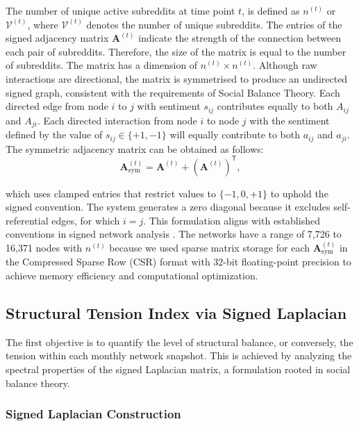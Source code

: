 \documentclass[a4paper,fleqn]{cas-dc}
\begin{document}
The number of unique active subreddits at time point \( t \), is defined as \( n^{(t)} \) or \( \mathcal{V}^{(t)}\), where \( \mathcal{V}^{(t)} \) denotes the number of unique subreddits. The entries of the signed adjacency matrix \( \mathbf{A}^{(t)} \) indicate the strength of the connection between each pair of subreddits. Therefore, the size of the matrix is equal to the number of subreddits.
The matrix has a dimension of $ n^ {(t )} \times n ^ {(t)}$. Although raw interactions are directional, the matrix is symmetrised to produce an undirected signed graph, consistent with the requirements of Social Balance Theory. Each directed edge from node $i$ to $j$ with sentiment $s_{ij}$ contributes equally to both $A_{ij}$ and $A_{ji}$. Each directed interaction from node \(i\) to node \(j\) with the sentiment defined by the value of $s _{ ij } \in \{ + 1,- 1\}$ will equally contribute to both $a _{ ij }$ and $a _{ ji }$. The symmetric adjacency matrix can be obtained as follows:
\begin{equation}
\label{eq:symmetric_adjacency}
\mathbf{A}_{\mathrm{sym}}^{(t)} = \mathbf{A}^{(t)} + (\mathbf{A}^{(t)})^{\mathsf{T}},
\end{equation}

which uses clamped entries that restrict values to \( \{-1, 0, +1\} \) to uphold the signed convention. The system generates a zero diagonal because it excludes self-referential edges, for which \( i = j \). This formulation aligns with established conventions in signed network analysis \cite{21_Leskovec2010, 22_Tang2016}. The networks have a range of 7,726 to 16,371 nodes with $n^{(t)}$ because we used sparse matrix storage for each \( \mathbf{A}_{\text{sym}}^{(t)} \) in the Compressed Sparse Row (CSR) format with 32-bit floating-point precision to achieve memory efficiency and computational optimization.

\subsection{Structural Tension Index via Signed Laplacian}
\label{sec:objectivel_sti}

The first objective is to quantify the level of structural balance, or conversely, the tension within each monthly network snapshot. This is achieved by analyzing the spectral properties of the signed Laplacian matrix, a formulation rooted in social balance theory.

\subsubsection{Signed Laplacian Construction}
\end{document}
